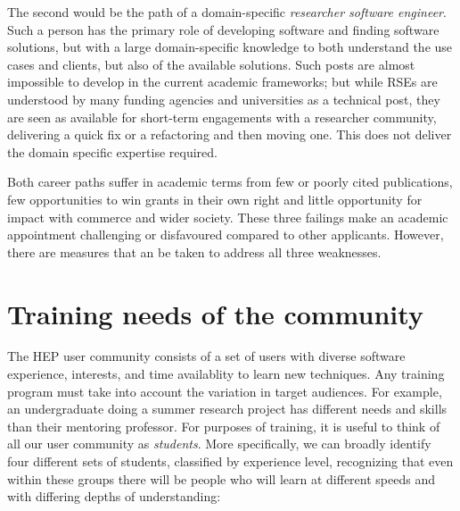 The second would be the path of a domain-specific \emph{researcher software engineer}. Such a person has the primary role of developing software and finding software solutions, but with a large domain-specific knowledge to both understand the use cases and clients, but also of the available solutions.  Such posts are almost impossible to develop in the current academic frameworks; but while RSEs are understood by many funding agencies and universities as a technical post, they are seen as available for short-term engagements with a researcher community, delivering a quick fix or a refactoring and then moving one. This does not deliver the domain specific expertise required. 

Both career paths suffer in academic terms from few or poorly cited publications, few opportunities to win grants in their own right and little opportunity for impact with commerce and wider society. These three failings make an academic appointment challenging or disfavoured compared to other applicants. However, there are measures that an be taken to address all three weaknesses. 



\section{Training needs of the community}


The HEP user community consists of a set of users with diverse software experience, interests, and time availablity to learn new techniques.  Any training program must take into account the variation in target audiences. For example, an undergraduate doing a summer research project has different needs and skills than their mentoring professor.
For purposes of training, it is useful to think of all our user community as \emph{students}. More specifically, we can broadly identify four different sets of students, classified by experience level, recognizing that even within these groups there will be people who will learn at different speeds and with differing depths of understanding:

